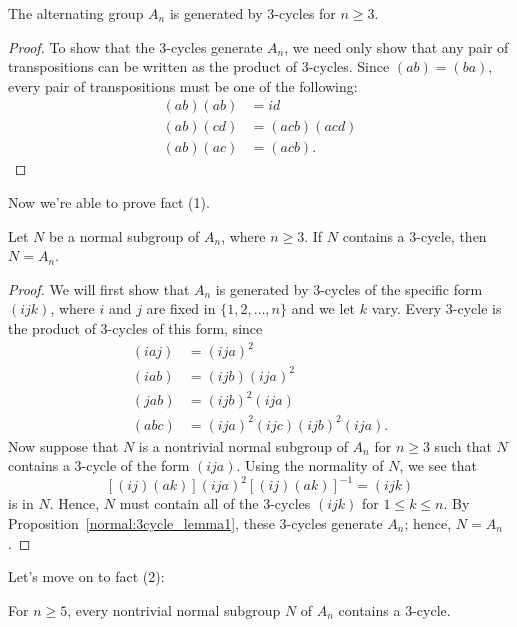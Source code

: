{\begin{thm}\label{normal:3cycle_lemma1}
The alternating group $A_n$ is generated by $3$-cycles for $n \geq 3$.
\end{thm}
 
\begin{proof}
To show that the 3-cycles generate $A_n$, we need only show that any
pair of transpositions can be written as the product of 3-cycles.
Since $(a b) = (b a)$, every pair of transpositions must be one of the
following: 
\begin{align*}
(ab)(ab) & = id \\
(ab)(cd) & = (acb)(acd) \\
(ab)(ac) & = (acb).
\end{align*}
\end{proof}
 
\noindent
Now we're able to prove fact (1).

\begin{thm}\label{normal:3cycle_lemma2}
Let $N$ be a  normal subgroup of $A_n$, where $n \geq 3$. If $N$ 
contains a $3$-cycle, then $N = A_n$. 
\end{thm}
 
 
\begin{proof}
We will first show that $A_n$ is generated by 3-cycles of the specific
form $(ijk)$, where $i$ and $j$ are fixed in  $\{ 1, 2, \ldots, n \}$
and we let $k$ vary. Every 3-cycle is the product of 3-cycles of this 
form, since
\begin{align*}
(i a j) & = (i j a)^2  \\
(i a b) & = (i j b) (i j a)^2 \\
(j a b) & = (i j b)^2 (i j a) \\
(a b c) & = (i j a)^2 (i j c) (i j b)^2 (i j a).
\end{align*}
Now suppose that $N$ is a nontrivial normal subgroup of $A_n$ for $n 
\geq 3$  such that $N$ contains a 3-cycle of the form $(i j a)$. Using
the normality of $N$, we see that
\[
[(i j)(a k)](i j a)^2 [(i j)(a k)]^{-1} = (i j k)
\]
is in $N$. Hence, $N$ must contain all of the 3-cycles $(i j k)$ 
for $1 \leq k \leq n$. By Proposition~\ref{normal:3cycle_lemma1}, these 3-cycles generate $A_n$; 
hence, $N = A_n$. 
\end{proof}
\bigskip
 
\noindent
Let's move on to fact (2):

\begin{thm}\label{normal:3cycle_lemma3}
For $n \geq 5$, every nontrivial normal subgroup $N$ of $A_n$ contains a
$3$-cycle. 
\end{thm}

}

